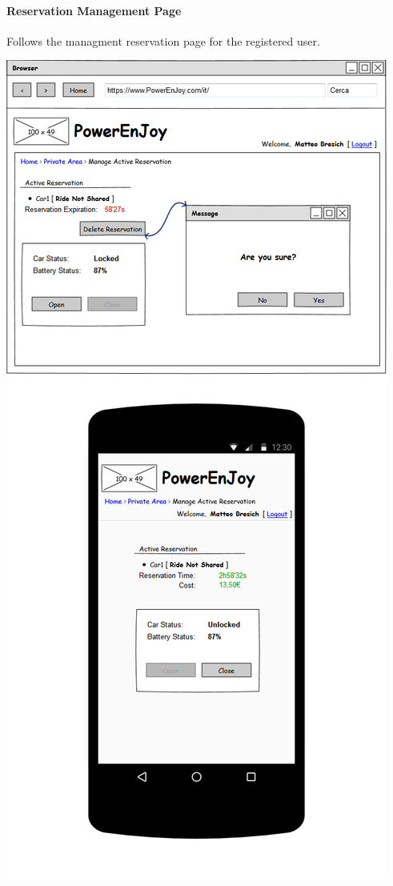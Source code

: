 \documentclass{article}
\begin{document}
			\paragraph{Reservation Management Page} Follows the managment reservation page for the registered user.
			\begin{center}
				\includegraphics[width=0.6\linewidth]{"img/ui/delete-reservation"}
			\end{center}
			\pagebreak
			
\end{document}
